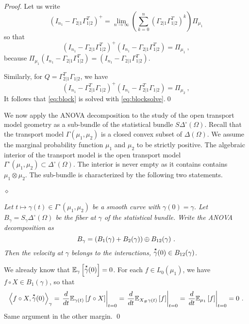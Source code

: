 \documentclass[runningheads]{llncs}
\begin{document}
\begin{proof}
  Let us write
%
\begin{equation*}
  (I_{n_1}-\Gamma_{2|1}\Gamma_{1|2}^T)^{+} = \lim_{n\to\infty} \left(\sum_{k=0}^n (\Gamma_{2|1}\Gamma_{1|2}^T)^k\right) \Pi_{\mu_1}  
\end{equation*}
%
so that
%
\begin{equation*}
  (I_{n_1}-\Gamma_{2|1}\Gamma_{1|2}^T)^{+}(I_{n_1}-\Gamma_{2|1}\Gamma_{1|2}^T) = \Pi_{\mu_1} \ ,
\end{equation*}
%
because $\Pi_{\mu_1} (I_{n_1}-\Gamma_{2|1}\Gamma_{1|2}^T) = (I_{n_1}-\Gamma_{2|1}\Gamma_{1|2}^T)$.

Similarly, for $Q = \Gamma_{2|1}^T\Gamma_{1|2}$, we have
%
\begin{equation*}
  (I_{n_1}-\Gamma_{2|1}^T\Gamma_{1|2})^{+}(I_{n_1}-\Gamma_{2|1}^T\Gamma_{1|2}) = \Pi_{\mu_2} \ ,
\end{equation*}
%
It follows that \cref{eq:block} is solved with \cref{eq:blocksolve}.\qed
\end{proof}

We now apply the ANOVA decomposition to the study of the open
transport model geometry as a sub-bundle of the statistical bundle
$S\Delta^\circ(\Omega)$. Recall that the transport model
$\Gamma(\mu_1,\mu_2)$ is a closed convex subset of
$\Delta(\Omega)$. We assume the marginal probability function
$\mu_1$ and $\mu_2$ to be strictly positive. The algebraic
interior of the transport model is the open transport model
$\Gamma^\circ(\mu_1,\mu_2) \subset \Delta^\circ(\Omega)$. The
interior is never empty as it contains contains
$\mu_1 \otimes \mu_2$. The sub-bundle is characterized by the
following two statements.

\paragraph{$\bm\diamond$} \emph{Let $t \mapsto \gamma(t) \in \Gamma^\circ(\mu_1,\mu_2)$ be a smooth curve with $\gamma(0)=\gamma$. Let $B_\gamma = S_\gamma \Delta^\circ(\Omega)$ be the fiber at $\gamma$ of the statistical bundle. Write the ANOVA decomposition as
  \begin{equation*}
    B_{\gamma} = (B_1(\gamma) + B_2(\gamma)) \oplus B_{12}(\gamma) \ .
  \end{equation*}
  Then the velocity at $\gamma$ belongs to the interactions, $\overset{\star}{\gamma}(0) \in B_{12}(\gamma)$.}


We already know that ${\operatorname{\mathbb E}}_{\gamma}\left[\overset{\star}{\gamma}(0)\right] = 0$. For each $f \in L_0(\mu_1)$, we have $f \circ X \in B_1(\gamma)$, so that 
%
    \begin{equation*}
    \left\langle f \circ X , \overset{\star}{\gamma}(0) \right\rangle_{\gamma} = \left. \frac{d}{dt} {\operatorname{\mathbb E}}_{\gamma(t)}\left[f \circ X\right] \right|_{t=0} = \left. \frac{d}{dt} {\operatorname{\mathbb E}}_{X_{\#}\gamma(t)}\left[f\right] \right|_{t=0} = \left. \frac{d}{dt} {\operatorname{\mathbb E}}_{\mu_1}\left[f\right] \right|_{t=0} = 0 \ .
    \end{equation*}
%
Same argument in the other margin. \qed
\end{document}
